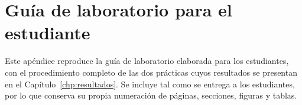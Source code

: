 \documentclass[12pt,a4paper,oneside]{report}
\begin{document}
\chapter{Guía de laboratorio para el estudiante}
\label{chp:guia}

Este apéndice reproduce la guía de laboratorio elaborada para los estudiantes, con el procedimiento completo de las dos prácticas cuyos resultados se presentan en el Capítulo~\ref{chp:resultados}. Se incluye tal como se entrega a los estudiantes, por lo que conserva su propia numeración de páginas, secciones, figuras y tablas.


\end{document}
